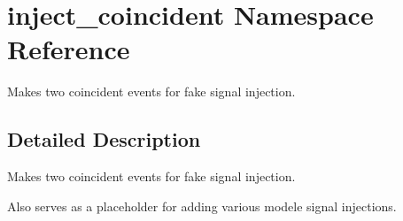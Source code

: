 \hypertarget{namespaceinject__coincident}{\section{inject\-\_\-coincident Namespace Reference}
\label{namespaceinject__coincident}
}


\begin{DoxyVerb} Makes two coincident events for fake signal injection.\end{DoxyVerb}
  




\subsection{Detailed Description}
\begin{DoxyVerb} Makes two coincident events for fake signal injection.\end{DoxyVerb}
 Also serves as a placeholder for adding various modele signal injections. 